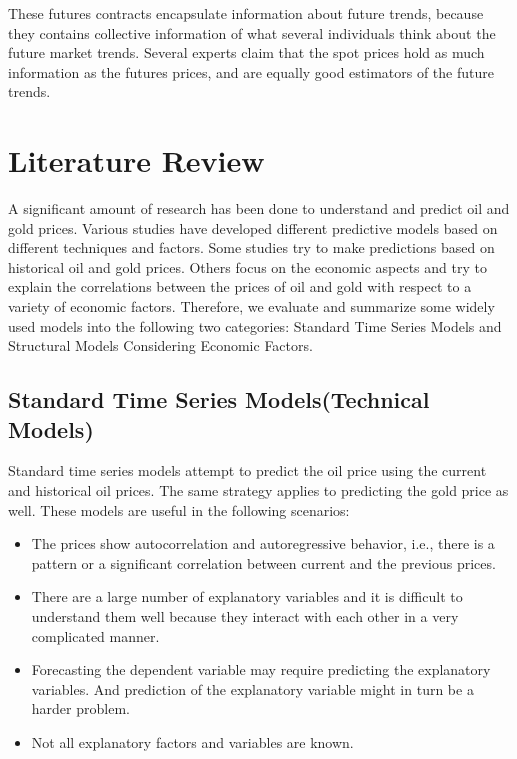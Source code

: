 \documentclass[runningheads]{llncs}
\begin{document}
\noindent These futures contracts encapsulate information about future trends, because they contains collective information of what several individuals think about the future market trends. Several experts claim that the spot prices hold as much information as the futures prices, and are equally good estimators of the future trends. 

\newpage

\section{Literature Review}
A significant amount of research has been done to understand and predict oil and gold prices. Various studies have developed different predictive models based on different techniques and factors. Some studies try to make predictions based on historical oil and gold prices. Others focus on the economic aspects and try to explain the correlations between the prices of oil and gold with respect to a variety of economic factors. Therefore, we evaluate and summarize some widely used models into the following two categories: Standard Time Series Models and Structural Models Considering Economic Factors.

\subsection{Standard Time Series Models(Technical Models)}
Standard time series models attempt to predict the oil price using the current and historical oil prices. The same strategy applies to predicting the gold price as well. These models are useful in the following scenarios:
\begin {itemize}
\item The prices show autocorrelation and autoregressive behavior, i.e., there is a pattern or a significant correlation between current and the previous prices.\\
\item There are a large number of explanatory variables and it is difficult to understand them well because they interact with each other in a very complicated manner. \\
\item Forecasting the dependent variable may require predicting the explanatory variables. And prediction of the explanatory variable might in turn be a harder problem.\\
\item Not all explanatory factors and variables are known.\\ 
\end {itemize}
\end{document}
